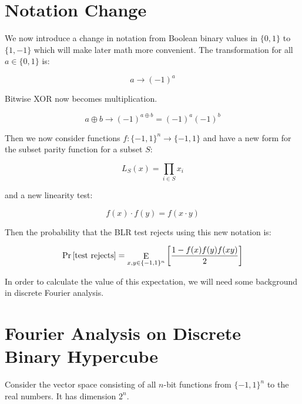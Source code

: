 \documentclass[12pt]{article}
\begin{document}
\section{Notation Change}

We now introduce a change in notation from Boolean binary values in $\{0,1\}$
to $\{1,-1\}$ which will make later math more convenient.
The transformation for all $a \in \{0,1\}$ is:

\begin{displaymath}
a \rightarrow (-1)^a
\end{displaymath}

Bitwise XOR now becomes multiplication.

\begin{displaymath}
a \oplus b \rightarrow (-1)^{a\oplus b} = (-1)^a(-1)^b
\end{displaymath}

Then we now consider functions $f: \{-1,1\}^n \rightarrow \{-1,1\}$ and have
a new form for the subset parity function for a subset $S$:

\begin{displaymath}
L_S(x) = \prod_{i \in S} x_i
\end{displaymath}

and a new linearity test:

\begin{displaymath}
f(x)\cdot f(y) = f(x \cdot y)
\end{displaymath}

Then the probability that the BLR test rejects using this new notation is:

\begin{equation}
\Pr{\left[ \textrm{test rejects} \right]} =
\mathop{\rm {E}}_{x,y \in \{-1,1\}^n}\left[\frac{1 - f(x)f(y)f(xy)}{2} \right]
\end{equation}

In order to calculate the value of this expectation, we will need some
background in discrete Fourier analysis.

\section{Fourier Analysis on Discrete Binary Hypercube} 

Consider the vector space consisting of all $n$-bit functions from
$\{-1,1\}^n$ to the real numbers. It has dimension $2^n$.
\end{document}
